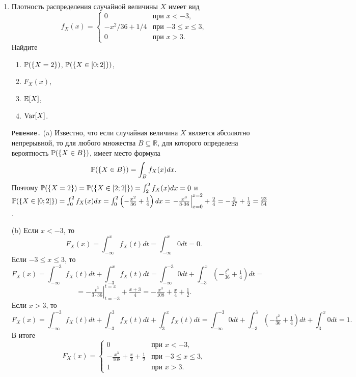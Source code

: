 \documentclass[12pt, a4paper]{article}\usepackage[]{graphicx}\usepackage[]{color}
\begin{document}
\begin{enumerate}
					(e) $\Corr(X+Y, X-Y) = \frac{\Cov(X+Y, X-Y)}{\sqrt{\Var[X+Y]}\sqrt{\Var[X-Y]}} = \frac{-1}{\sqrt{1}\sqrt{5}} = -\frac{1}{\sqrt{5}}$. $\Box$
					\item %
					Плотность распределения случайной величины $X$ имеет вид
					\[
					f_X(x) =          \begin{cases}
					0     &   \text{при $x < -3$,} \\
					-x^{2}/36 + 1/4   &   \text{при $-3 \leq x \leq 3$,} \\
					0     &   \text{при $x > 3$.}
					\end{cases}
					\]
					Найдите
					\begin{enumerate}
						\item $\P(\{X=2\})$, $\P(\{X \in [0;2]\})$,
						\item $F_X(x)$,
						\item $\E[X]$,
						\item $\Var[X]$.
					\end{enumerate}

					\verb"Решение." (a) Известно, что если случайная величина $X$ является абсолютно непрерывной, то для любого множества $B \subseteq \mathbb{R}$, для которого определена вероятность $\P(\{X \in B\})$, имеет место формула
					\[
					\P(\{X \in B\}) = \int_{B}f_X(x)dx.
					\]
					Поэтому $\P(\{X = 2\}) = \P(\{X \in [2;2]\}) = \int_{2}^{2}f_X(x)dx = 0$ и $\P(\{X \in [0;2]\}) = \int_{0}^{2}f_X(x)dx = \int_{0}^{2}\left(-\frac{x^2}{36} + \frac{1}{4}\right)dx = \left.-\frac{x^3}{3\cdot36}\right|_{x=0}^{x=2} + \frac{2}{4} = -\frac{2}{27} + \frac{1}{2} = \frac{23}{54}$.

					(b) Если $x < -3$, то
					\[
					F_X(x) = \int_{-\infty}^{x}f_X(t)dt = \int_{-\infty}^{x}0dt = 0 \text{.}
					\]
					Если $-3 \leq x \leq 3$, то
					\[
					F_X(x) = \int_{-\infty}^{-3}f_X(t)dt + \int_{-3}^{x}f_X(t)dt= \int_{-\infty}^{-3}0dt + \int_{-3}^{x}\left(-\tfrac{t^2}{36} + \tfrac{1}{4}\right)dt =
					\]
					\[
					= -\left.\tfrac{t^3}{3\cdot36}\right|_{t=-3}^{t=x} + \tfrac{x+3}{4} = -\tfrac{x^3}{108} + \tfrac{x}{4} + \tfrac{1}{2} \text{.}
					\]
					Если $x > 3$, то
					\[
					F_X(x) = \int_{-\infty}^{-3}f_X(t)dt + \int_{-3}^{3}f_X(t)dt + \int_{3}^{x}f_X(t)dt = \int_{-\infty}^{-3}0dt + \int_{-3}^{3}\left(-\tfrac{t^2}{36} + \tfrac{1}{4}\right)dt + \int_{3}^{x}0dt = 1 \text{.}
					\]
					В итоге
					\[
					F_X(x) =
					\begin{cases}
					0                   &   \text{при $x < -3$,} \\
					-\tfrac{x^3}{108} + \tfrac{x}{4} + \tfrac{1}{2}   &   \text{при $-3 \leq x \leq 3$,} \\
					1                   &   \text{при $x > 3$.}
					\end{cases}
					\]


\end{enumerate}
\end{document}
